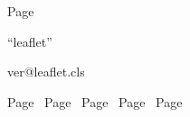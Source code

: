 \documentclass[
,foldcorr
]{leaflet}
\begin{document}
  \Huge\sffamily\bfseries\centering

  Page~\thepage \par
  { \normalsize ``leaflet''\par\csname ver@leaflet.cls\endcsname\par }
  \newpage
  Page~\thepage \newpage
  Page~\thepage \newpage
  Page~\thepage \newpage
  Page~\thepage \newpage
  Page~\thepage \newpage
\end{document}
